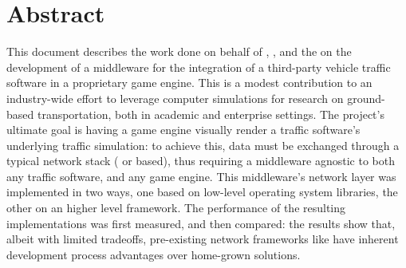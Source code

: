 \chapter*{Abstract}\label{ch:abstract}

This document describes the work done on behalf of , , and the  on the development of a middleware for the integration of a third-party vehicle traffic software in a proprietary game engine. This is a modest contribution to an industry-wide effort to leverage computer simulations for research on ground-based transportation, both in academic and enterprise settings. The project's ultimate goal is having a game engine visually render a traffic software's underlying traffic simulation: to achieve this, data must be exchanged through a typical network stack ( or  based), thus requiring a middleware agnostic to both any traffic software, and any game engine. This middleware's network layer was implemented in two ways, one based on low-level operating system libraries, the other on an higher level framework. The performance of the resulting implementations was first measured, and then compared: the results show that, albeit with limited tradeoffs, pre-existing network frameworks like  have inherent development process advantages over home-grown solutions.
